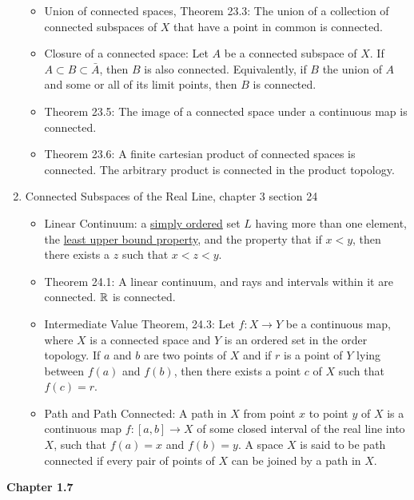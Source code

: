 \documentclass[12pt,letterpaper]{article}
\begin{document}
\begin{enumerate}
\begin{itemize}
    \item \label{thm:unionConnected} Union of connected spaces, Theorem 23.3: The union of a collection of connected subspaces of $X$ that have a point in common is connected.
    \item \label{thm:closureConnected} Closure of a connected space: Let $A$ be a connected subspace of $X$. If $A\subset B\subset \bar{A}$, then $B$ is also connected. Equivalently, if $B$ the union of $A$ and some or all of its limit points, then $B$ is connected.
    \item \label{thm:continuousConnected} Theorem 23.5: The image of a connected space under a continuous map is connected.
    \item \label{thm:finiteCartesianConnected} Theorem 23.6: A finite cartesian product of connected spaces is connected. The arbitrary product is connected in the product topology.
  \end{itemize}
  \item \label{sec:connectedRealLine} Connected Subspaces of the Real Line, chapter 3 section 24
  \begin{itemize}
    \item \label{dfn:linearContinuum} Linear Continuum: a \hyperref[dfn:simpleOrder]{simply ordered} set $L$ having more than one element, the \hyperref[dfn:leastUpperBoundProperty]{least upper bound property}, and the property that if $x<y$, then there exists a $z$ such that $x<z<y$.
    \item \label{thm:continuumConnected} Theorem 24.1: A linear continuum, and rays and intervals within it are connected. $\mathbb{R}$ is connected.
    \item \label{thm:IntermediateValue} Intermediate Value Theorem, 24.3: Let $f:X\rightarrow Y$ be a continuous map, where $X$ is a connected space and $Y$ is an ordered set in the order topology. If $a$ and $b$ are two points of $X$ and if $r$ is a point of $Y$ lying between $f(a)$ and $f(b)$, then there exists a point $c$ of $X$ such that $f(c)=r$.
    \item \label{dfn:pathConnected} Path and Path Connected: A path in $X$ from point $x$ to point $y$ of $X$ is a continuous map $f:[a,b]\rightarrow X$ of some closed interval of the real line into $X$, such that $f(a)=x$ and $f(b)=y$. A space $X$ is said to be path connected if every pair of points of $X$ can be joined by a path in $X$.
  \end{itemize}
\end{enumerate}
\textbf{Chapter 1.7} \label{sec:chapter1.7}

\end{document}

